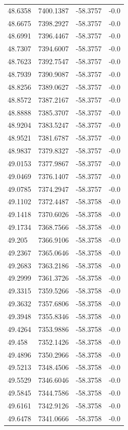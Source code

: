 \begin{table}[H]
\begin{tabular}{llll}
48.6358 & 7400.1387 & -58.3757 & -0.0 \\
48.6675 & 7398.2927 & -58.3757 & -0.0 \\
48.6991 & 7396.4467 & -58.3757 & -0.0 \\
48.7307 & 7394.6007 & -58.3757 & -0.0 \\
48.7623 & 7392.7547 & -58.3757 & -0.0 \\
48.7939 & 7390.9087 & -58.3757 & -0.0 \\
48.8256 & 7389.0627 & -58.3757 & -0.0 \\
48.8572 & 7387.2167 & -58.3757 & -0.0 \\
48.8888 & 7385.3707 & -58.3757 & -0.0 \\
48.9204 & 7383.5247 & -58.3757 & -0.0 \\
48.9521 & 7381.6787 & -58.3757 & -0.0 \\
48.9837 & 7379.8327 & -58.3757 & -0.0 \\
49.0153 & 7377.9867 & -58.3757 & -0.0 \\
49.0469 & 7376.1407 & -58.3757 & -0.0 \\
49.0785 & 7374.2947 & -58.3757 & -0.0 \\
49.1102 & 7372.4487 & -58.3758 & -0.0 \\
49.1418 & 7370.6026 & -58.3758 & -0.0 \\
49.1734 & 7368.7566 & -58.3758 & -0.0 \\
49.205 & 7366.9106 & -58.3758 & -0.0 \\
49.2367 & 7365.0646 & -58.3758 & -0.0 \\
49.2683 & 7363.2186 & -58.3758 & -0.0 \\
49.2999 & 7361.3726 & -58.3758 & -0.0 \\
49.3315 & 7359.5266 & -58.3758 & -0.0 \\
49.3632 & 7357.6806 & -58.3758 & -0.0 \\
49.3948 & 7355.8346 & -58.3758 & -0.0 \\
49.4264 & 7353.9886 & -58.3758 & -0.0 \\
49.458 & 7352.1426 & -58.3758 & -0.0 \\
49.4896 & 7350.2966 & -58.3758 & -0.0 \\
49.5213 & 7348.4506 & -58.3758 & -0.0 \\
49.5529 & 7346.6046 & -58.3758 & -0.0 \\
49.5845 & 7344.7586 & -58.3758 & -0.0 \\
49.6161 & 7342.9126 & -58.3758 & -0.0 \\
49.6478 & 7341.0666 & -58.3758 & -0.0 \\

\end{tabular}
\end{table}
